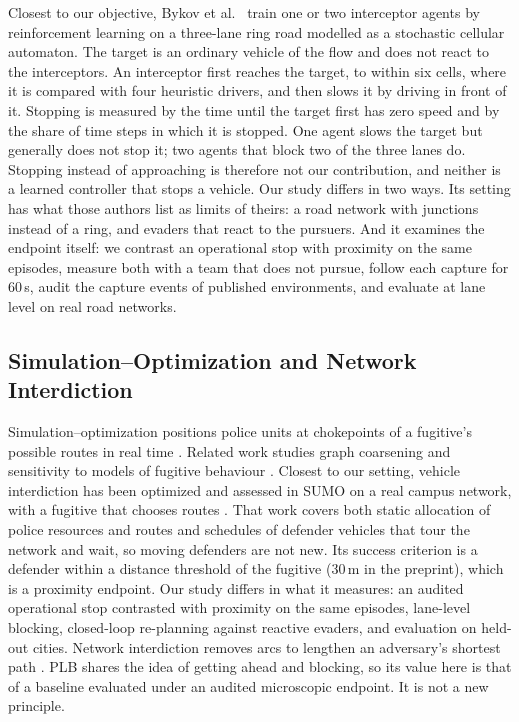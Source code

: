 \documentclass[5p,twocolumn]{elsarticle}
\begin{document}
Closest to our objective, Bykov et al.\ \cite{bykov2025interceptor} train one or two interceptor agents by
reinforcement learning on a three-lane ring road modelled as a stochastic cellular automaton. The target is an
ordinary vehicle of the flow and does not react to the interceptors. An interceptor first reaches the target, to
within six cells, where it is compared with four heuristic drivers, and then slows it by driving in front of it.
Stopping is measured by the time until the target first has zero speed and by the share of time steps in which it is
stopped. One agent slows the target but generally does not stop it; two agents that block two of the three lanes do.
Stopping instead of approaching is therefore not our contribution, and neither is a learned controller that stops a
vehicle. Our study differs in two ways. Its setting has what those authors list as limits of theirs: a road network
with junctions instead of a ring, and evaders that react to the pursuers. And it examines the endpoint itself: we
contrast an operational stop with proximity on the same episodes, measure both with a team that does not pursue,
follow each capture for 60\,s, audit the capture events of published environments, and evaluate at lane level on
real road networks.

\subsection{Simulation--Optimization and Network Interdiction}

Simulation--optimization positions police units at chokepoints of a fugitive's possible routes in real time
\cite{vandroffelaar2024simopt}. Related work studies graph coarsening \cite{vandroffelaar2025graph} and sensitivity
to models of fugitive behaviour \cite{vandroffelaar2025behavior}. Closest to our setting, vehicle interdiction has
been optimized and assessed in SUMO on a real campus network, with a fugitive that chooses routes
\cite{samanta2021interdiction,samanta2024interdiction}. That work covers both static allocation of police resources
and routes and schedules of defender vehicles that tour the network and wait, so moving defenders are not new. Its
success criterion is a defender within a distance threshold of the fugitive (30\,m in the preprint), which is a
proximity endpoint. Our study differs in what it measures: an audited operational stop contrasted with proximity on
the same episodes, lane-level blocking, closed-loop re-planning against reactive evaders, and evaluation on held-out
cities. Network interdiction removes arcs to lengthen an adversary's shortest path \cite{wood1993,israeli2002}. PLB
shares the idea of getting ahead and blocking, so its value here is that of a baseline evaluated under an audited
microscopic endpoint. It is not a new principle.
\end{document}

